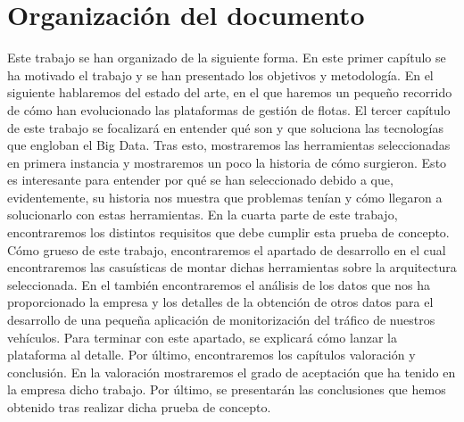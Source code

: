 \section{Organización del documento\label{organizacion}}

Este trabajo se han organizado de la siguiente forma. En este primer
capítulo se ha motivado el trabajo y se han presentado los objetivos y
metodología. En el siguiente hablaremos del estado del arte, en el que
haremos un pequeño recorrido de cómo han evolucionado las plataformas
de gestión de flotas. El tercer capítulo de este trabajo se focalizará
en entender qué son y que soluciona las tecnologías que engloban el
Big Data. Tras esto, mostraremos las herramientas seleccionadas en
primera instancia y mostraremos un poco la historia de cómo surgieron.
Esto es interesante para entender por qué se han seleccionado debido
a que, evidentemente, su historia nos muestra que problemas tenían y
cómo llegaron a solucionarlo con estas herramientas. En la cuarta
parte de este trabajo, encontraremos los distintos requisitos que debe
cumplir esta prueba de concepto. Cómo grueso de este trabajo,
encontraremos el apartado de desarrollo en el cual encontraremos las
casuísticas de montar dichas herramientas sobre la arquitectura
seleccionada. En el también encontraremos el análisis de los datos que
nos ha proporcionado la empresa \mdata{} y los detalles de la
obtención de otros datos para el desarrollo de una pequeña aplicación
de monitorización del tráfico de nuestros vehículos. Para terminar con
este apartado, se explicará cómo lanzar la plataforma al detalle. Por
último, encontraremos los capítulos valoración y conclusión. En la
valoración mostraremos el grado de aceptación que ha tenido en la
empresa dicho trabajo. Por último, se presentarán las conclusiones que
hemos obtenido tras realizar dicha prueba de concepto.

